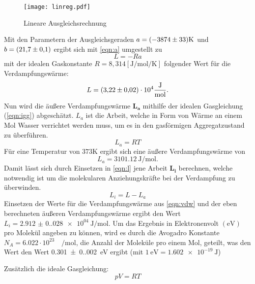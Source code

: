 \begin{figure}[H]
  \centering
  \texttt{[image: linreg.pdf]}
  \label{fig:1}
  \caption{Lineare Ausgleichsrechnung}
\end{figure}

\noindent Mit den Parametern der Ausgleichsgeraden $a = (\num{-3874 +- 33})\unit{\kelvin}
$ und $b = (\num{21.7 +- 0.1})$ ergibt sich mit \autoref{eqn:a}
umgestellt zu
\begin{equation}
  L = -Ra
\end{equation}
mit der idealen Gaskonstante $R =  8,314[\unit{\joule\per\mol\per\kelvin}] $ 
folgender Wert für die Verdampfungswärme:
\begin{equation}
  \label{eqn:vdw}
  L = \num{3.22 +- 0.02 e4} \unit{\joule\per\mol}.
\end{equation}
Nun wird die äußere Verdampfungswärme $\symbf{L_a}$ mithilfe der idealen 
Gasgleichung (\autoref{eqn:igg}) abgeschätzt. $L_a$ ist die Arbeit, welche 
in Form von Wärme an einem Mol Wasser verrichtet werden muss, um es
in den gasförmigen Aggregatzustand zu überführen. 
\begin{equation}
  L_a = RT
\end{equation}
Für eine Temperatur von $373 \unit{\kelvin}$ ergibt sich eine äußere 
Verdampfungswärme von 
\begin{equation*}
  L_a = \qty{3101.12}{\joule\per\mol}.
\end{equation*}
Damit lässt sich durch Einsetzen in \autoref{eqn:l} jene Arbeit $\symbf{L_i}$
berechnen, welche notwendig ist um die molekularen Anziehungskräfte 
bei der Verdampfung zu überwinden.
\begin{equation}
  \label{eqn:l}
  L_i = L - L_a
\end{equation}
Einsetzen der Werte für die Verdampfungswärme aus \autoref{eqn:vdw} und der 
eben berechneten äußeren Verdampfungswärme ergibt den Wert $L_i = \qty{2.912(0.028)e04}{\joule\per\mol}$.
Um das Ergebnis in Elektronenvolt $(\unit{\eV})$ pro Molekül angeben zu können, wird es durch die 
Avogadro Konstante $N_A = 6.022 \cdot 10^23 \quad \unit{\per\mol}$,
die Anzahl der Moleküle pro einem Mol, geteilt, was den Wert den Wert 
\qty{0.301(0.002)}{\eV} ergibt (mit $\qty{1}{\eV} = \qty{1.602e-19}{\joule}$)

Zusätzlich die ideale Gasgleichung:
\begin{equation}
  \label{eqn:igg}
  pV = RT
\end{equation}



